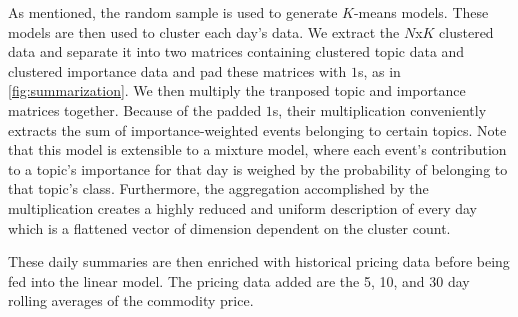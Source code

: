 As mentioned, the random sample is used to generate $K$-means models. These models are then used to cluster each day's data. We extract the $N$x$K$ clustered data and separate it into two matrices containing clustered topic data and clustered importance data and pad these matrices with $1$s, as in \ref{fig:summarization}. We then multiply the tranposed topic and importance matrices together. Because of the padded $1$s, their multiplication conveniently extracts the sum of importance-weighted events belonging to certain topics. Note that this model is extensible to a mixture model, where each event's contribution to a topic's importance for that day is weighed by the probability of belonging to that topic's class. Furthermore, the aggregation accomplished by the multiplication creates a highly reduced and uniform description of every day which is a flattened vector of dimension dependent on the cluster count.

These daily summaries are then enriched with historical pricing data before being fed into the linear model. The pricing data added are the 5, 10, and 30 day rolling averages of the commodity price. %


